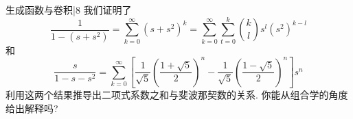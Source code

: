 \newChapter 生成函数与卷积|8
\exer 我们证明了
\[\frac{1}{1-(s+s^2)}=\sum_{k=0}^\infty (s+s^2)^k=\sum_{k=0}^\infty \sum_{t=0}^k\binom{k}{l}s^l(s^2)^{k-l} \]
和
\[\frac{s}{1-s-s^2}=\sum_{k=0}^\infty \left[\frac{1}{\sqrt5}\left(\frac{1+\sqrt5}{2}\right)^n - \frac{1}{\sqrt5}\left(\frac{1-\sqrt5}{2}\right)^n\right]s^n \]
利用这两个结果推导出二项式系数之和与斐波那契数的关系. 你能从组合学的角度给出解释吗?